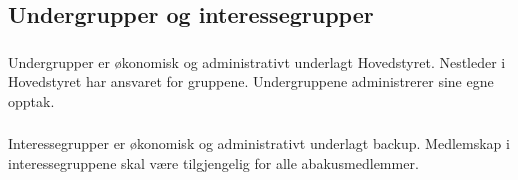 \subsection{Undergrupper og interessegrupper}

\subsubsection{}
Undergrupper er økonomisk og administrativt underlagt Hovedstyret. Nestleder i
Hovedstyret har ansvaret for gruppene. Undergruppene administrerer sine egne
opptak.

\subsubsection{}
Interessegrupper er økonomisk og administrativt underlagt backup. Medlemskap i
interessegruppene skal være tilgjengelig for alle abakusmedlemmer.
